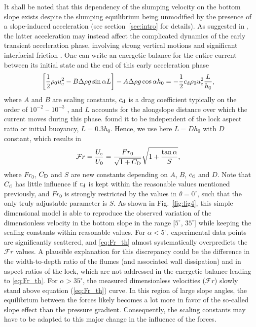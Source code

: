 \documentclass[12pt]{article}
\begin{document}
It shall be noted that this dependency of the slumping velocity on the bottom slope exists despite the slumping equilibrium being unmodified by the presence of a slope-induced acceleration (see section~\ref{sec:intro} for details). As suggested in \citet{Gadal2023}, the latter acceleration may instead affect the complicated dynamics of the early transient acceleration phase, involving strong vertical motions and significant interfacial friction \citep{Cantero2007}.
%
One can write an energetic balance for the entire current between its initial state and the end of this early acceleration phase \citep{Gadal2023}
\begin{equation}
	\label{eq:energetic_balance}
	\left[\frac{1}{2}\rho_{0}u_{\text c}^{2} - B \Delta\rho g \sin\alpha L\right] - A \Delta\rho g \cos\alpha h_{0} =  - \frac{1}{2}c_{\text d}\rho_{0}u_{\text c}^{2} \frac{L}{h_{0}},
\end{equation}
where $A$ and $B$ are scaling constants, $c_{\text d}$ is a drag coefficient typically on the order of $10^{-2}$ -- $10^{-3}$ \citep{hogg2004effects}, and $L$ accounts for the alongslope distance over which the current moves during this phase. \citet{Cantero2007} found it to be independent of the lock aspect ratio or initial buoyancy, $L = 0.3 h_{0}$. Hence, we use here $L = D h_{0}$ with $D$ constant, which results in
\begin{equation}
	\label{eq:Fr_th}
	\mathcal{F}r = \frac{U_{\text c}}{U_0} = \frac{Fr_0}{\sqrt{1 + C_{\text D}}} \sqrt{1 + \frac{\tan\alpha}{S}},
\end{equation}
where $Fr_0$, $C_{\text D}$ and $S$ are new constants depending on $A$, $B$, $c_{\text d}$ and $D$. Note that $C_{\rm d}$ has little influence if $c_{\text d}$ is kept within the reasonable values mentioned previously, and $Fr_0$ is strongly restricted by the values in $\theta = 0^\circ$, such that the only truly adjustable parameter is $S$. As shown in Fig.~\ref{fig:fig4}, this simple dimensional model is able to reproduce the observed variation of the dimensionless velocity in the bottom slope in the range [$5^\circ$, $35^\circ$] while keeping the scaling constants within reasonable values.
%
For $\alpha < 5^\circ$, experimental data points are significantly scattered, and \eqref{eq:Fr_th} almost systematically overpredicts the $\mathcal{F}r$ values. A plausible explanation for this discrepancy could be the difference in the width-to-depth ratio of the flumes (and associated wall dissipation) and in aspect ratios of the lock, which are not addressed in the energetic balance leading to \eqref{eq:Fr_th}.
%
For $\alpha > 35^\circ$, the measured dimensionless velocities ($\mathcal{F}r$) slowly stand above equation (\ref{eq:Fr_th}) curve. In this region of large slope angles, the equilibrium between the forces likely becomes a lot more in favor of the so-called slope effect than the pressure gradient. Consequently, the scaling constants may have to be adapted to this major change in the influence of the forces.
\end{document}

